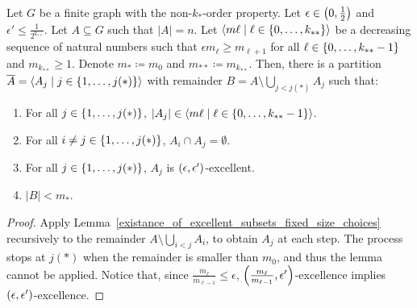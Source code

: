     \lemma[Claim 5.14.1]\label{existance_of_excellent_partition}
        Let $G$ be a finite graph with the non-$k_{*}$-order property.
        Let $\epsilon \in \left( 0, \frac{1}{2} \right)$ and $\epsilon' \leq \frac{1}{2^{k_{**}}}$.
        Let $A \subseteq G$ such that $|A| = n$.
        Let $\left< m\ell \mid \ell \in \left\{ 0, \dots, k_{**} \right\} \right>$ be a decreasing sequence of natural numbers such that
        $\epsilon m_{\ell} \geq m_{\ell+1}$ for all $\ell \in \left\{ 0, \dots, k_{**}-1 \right\}$ and $m_{k_{**}} \geq 1$.
        Denote $m_* \coloneq m_0$ and $m_{**} \coloneq m_{k_{**}}$.
        Then, there is a partition $\overline{A} = \left< A_j \mid j \in \left\{ 1, \dots, j(*) \right\} \right>$ with remainder
        $B = A \setminus \bigcup_{j < j(*)} A_j$ such that:
        \begin{enumerate}[label=(\alph*), ref=\alph*]
            \item \label{itm:5.14.1.a} For all $j \in \left\{ 1, \dots, j(*) \right\}$, $|A_j| \in \left< m\ell \mid \ell \in \left\{ 0, \dots, k_{**}-1 \right\} \right>$.
            \item \label{itm:5.14.1.b} For all $i \neq j \in \left\{ 1, \dots, j(*) \right\}$, $A_i \cap A_j = \emptyset$.
            \item \label{itm:5.14.1.c} For all $j \in \left\{ 1, \dots, j(*) \right\}$, $A_j$ is $\left( \epsilon, \epsilon' \right)$-excellent.
            \item \label{itm:5.14.1.d} $|B| < m_*$.
        \end{enumerate}
        \begin{proof}
            Apply Lemma~\ref{existance_of_excellent_subsets_fixed_size_choices} recursively to the remainder
            $A \setminus \bigcup_{i < j} A_i$, to obtain $A_j$ at each step.
            The process stops at $j(*)$ when the remainder is smaller than $m_0$, and thus the lemma cannot be applied.
            Notice that, since $\frac{m_\ell}{m_{\ell-1}} \leq \epsilon$, $\left( \frac{m_\ell}{m_{\ell-1}}, \epsilon' \right)$-excellence
            implies $\left( \epsilon, \epsilon' \right)$-excellence.
        \end{proof}


